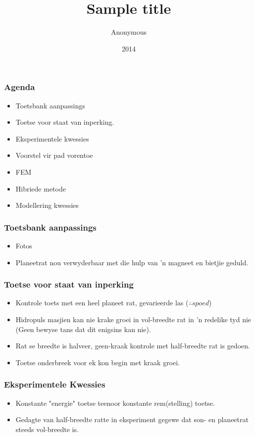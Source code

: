 \documentclass{beamer}
\title{Sample title}
\author{Anonymous}
\institute{Overleaf}
\date{2014}
\begin{document}
\begin{frame}
\frametitle{Agenda}
\begin{itemize}
	\item Toetsbank aanpassings 
	\item Toetse voor staat van inperking.
	\item Eksperimentele kwessies 
	\item Voorstel vir pad vorentoe
	\item FEM
	\item Hibriede metode
	\item Modellering kwessies
\end{itemize}
\end{frame}

\begin{frame}
\frametitle{Toetsbank aanpassings}
\begin{itemize}
	\item  Fotos
	\item Planeetrat nou verwyderbaar met die hulp van 'n magneet en bietjie geduld. 
\end{itemize}
\end{frame}

\begin{frame}
\frametitle{Toetse voor staat van inperking}
\begin{itemize}
	\item  Kontrole toets met een heel planeet rat, gevarieerde las ($\therefore{spoed}$) 
	\item Hidropuls masjien kan nie krake groei in vol-breedte rat in 'n redelike tyd nie (Geen bewyse tans dat dit enigsins kan nie).
	\item Rat se breedte is halveer, geen-kraak kontrole met half-breedte rat is gedoen.
	\item Toetse onderbreek voor ek kon begin met kraak groei. 
\end{itemize}
\end{frame}

\begin{frame}
\frametitle{Eksperimentele Kwessies}
\begin{itemize}
	\item Konstante "energie" toetse teenoor konstante rem(stelling) toetse.
	\item Gedagte van half-breedte ratte in eksperiment gegewe dat son- en planeetrat steeds vol-breedte is. 
\end{itemize}
\end{frame}
\end{document}
